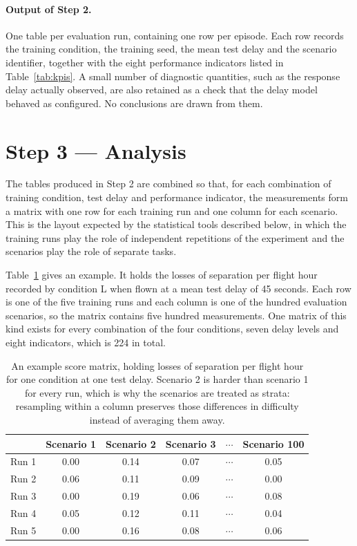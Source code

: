 \documentclass[11pt,a4paper]{article}
\begin{document}
\paragraph{Output of Step 2.} One table per evaluation run, containing one row
per episode. Each row records the training condition, the training seed, the
mean test delay and the scenario identifier, together with the eight performance
indicators listed in Table~\ref{tab:kpis}. A small number of diagnostic
quantities, such as the response delay actually observed, are also retained as a
check that the delay model behaved as configured. No conclusions are drawn from
them.

\section{Step 3 --- Analysis}

The tables produced in Step 2 are combined so that, for each combination of
training condition, test delay and performance indicator, the measurements form
a matrix with one row for each training run and one column for each scenario.
This is the layout expected by the statistical tools described below, in which
the training runs play the role of independent repetitions of the experiment and
the scenarios play the role of separate tasks.

Table~\ref{tab:matrix} gives an example. It holds the losses of separation per
flight hour recorded by condition L when flown at a mean test delay of 45
seconds. Each row is one of the five training runs and each column is one of the
hundred evaluation scenarios, so the matrix contains five hundred measurements.
One matrix of this kind exists for every combination of the four conditions,
seven delay levels and eight indicators, which is 224 in total.

\begin{table}[h]
\centering
\begin{tabular}{@{}lccccc@{}}
\toprule
      & Scenario 1 & Scenario 2 & Scenario 3 & $\cdots$ & Scenario 100 \\
\midrule
Run 1 & 0.00 & 0.14 & 0.07 & $\cdots$ & 0.05 \\
Run 2 & 0.06 & 0.11 & 0.09 & $\cdots$ & 0.00 \\
Run 3 & 0.00 & 0.19 & 0.06 & $\cdots$ & 0.08 \\
Run 4 & 0.05 & 0.12 & 0.11 & $\cdots$ & 0.04 \\
Run 5 & 0.00 & 0.16 & 0.08 & $\cdots$ & 0.06 \\
\bottomrule
\end{tabular}
\caption{An example score matrix, holding losses of separation per flight hour
for one condition at one test delay. Scenario 2 is harder than scenario 1 for
every run, which is why the scenarios are treated as strata: resampling within a
column preserves those differences in difficulty instead of averaging them
away.}
\label{tab:matrix}
\end{table}
\end{document}

